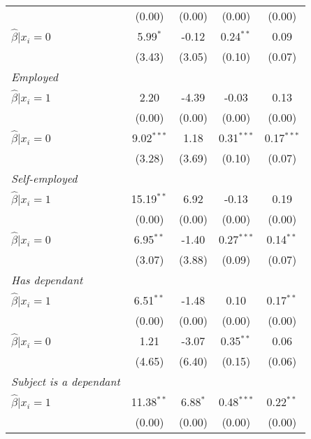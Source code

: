 \begin{table}[h]
{\begin{threeparttable}
\begin{tabular}{l*{4}{c}}
                &   (0.00)&   (0.00)&   (0.00)&   (0.00)\\
\hspace{0.5cm} \(\hat\beta|x_i=0\)&5.99$^{*}$&    -0.12&0.24$^{**}$&     0.09\\
                &   (3.43)&   (3.05)&   (0.10)&   (0.07)\\
\textit{Employed}&         &         &         &         \\
\hspace{0.5cm} \(\hat\beta|x_i=1\)&     2.20&    -4.39&    -0.03&     0.13\\
                &   (0.00)&   (0.00)&   (0.00)&   (0.00)\\
\hspace{0.5cm} \(\hat\beta|x_i=0\)&9.02$^{***}$&     1.18&0.31$^{***}$&0.17$^{***}$\\
                &   (3.28)&   (3.69)&   (0.10)&   (0.07)\\
\textit{Self-employed}&         &         &         &         \\
\hspace{0.5cm} \(\hat\beta|x_i=1\)&15.19$^{**}$&     6.92&    -0.13&     0.19\\
                &   (0.00)&   (0.00)&   (0.00)&   (0.00)\\
\hspace{0.5cm} \(\hat\beta|x_i=0\)&6.95$^{**}$&    -1.40&0.27$^{***}$&0.14$^{**}$\\
                &   (3.07)&   (3.88)&   (0.09)&   (0.07)\\
\textit{Has dependant}&         &         &         &         \\
\hspace{0.5cm} \(\hat\beta|x_i=1\)&6.51$^{**}$&    -1.48&     0.10&0.17$^{**}$\\
                &   (0.00)&   (0.00)&   (0.00)&   (0.00)\\
\hspace{0.5cm} \(\hat\beta|x_i=0\)&     1.21&    -3.07&0.35$^{**}$&     0.06\\
                &   (4.65)&   (6.40)&   (0.15)&   (0.06)\\
\textit{Subject is a dependant}&         &         &         &         \\
\hspace{0.5cm} \(\hat\beta|x_i=1\)&11.38$^{**}$&6.88$^{*}$&0.48$^{***}$&0.22$^{**}$\\
                &   (0.00)&   (0.00)&   (0.00)&   (0.00)\\

\end{tabular}
\end{threeparttable}}
\end{table}
